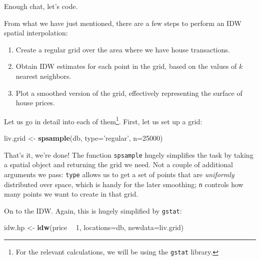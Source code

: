 \documentclass[
]{book}
\newenvironment{Shaded}{\begin{snugshade}}{\end{snugshade}}
\newcommand{\DataTypeTok}[1]{\textcolor[rgb]{0.13,0.29,0.53}{#1}}
\newcommand{\DecValTok}[1]{\textcolor[rgb]{0.00,0.00,0.81}{#1}}
\newcommand{\KeywordTok}[1]{\textcolor[rgb]{0.13,0.29,0.53}{\textbf{#1}}}
\newcommand{\NormalTok}[1]{#1}
\newcommand{\OperatorTok}[1]{\textcolor[rgb]{0.81,0.36,0.00}{\textbf{#1}}}
\newcommand{\StringTok}[1]{\textcolor[rgb]{0.31,0.60,0.02}{#1}}
\providecommand{\tightlist}{%
  \setlength{\itemsep}{0pt}\setlength{\parskip}{0pt}}
\begin{document}
Enough chat, let's code.

From what we have just mentioned, there are a few steps to perform an IDW spatial interpolation:

\begin{enumerate}
\def\labelenumi{\arabic{enumi}.}
\tightlist
\item
  Create a regular grid over the area where we have house transactions.
\item
  Obtain IDW estimates for each point in the grid, based on the values of \(k\) nearest neighbors.
\item
  Plot a smoothed version of the grid, effectively representing the surface of house prices.
\end{enumerate}

Let us go in detail into each of them\footnote{For the relevant calculations, we will be using the \texttt{gstat} library.}. First, let us set up a grid:

\begin{Shaded}
\begin{Highlighting}[]
\NormalTok{liv.grid <-}\StringTok{ }\KeywordTok{spsample}\NormalTok{(db, }\DataTypeTok{type=}\StringTok{'regular'}\NormalTok{, }\DataTypeTok{n=}\DecValTok{25000}\NormalTok{)}
\end{Highlighting}
\end{Shaded}

That's it, we're done! The function \texttt{spsample} hugely simplifies the task by taking a spatial object and returning the grid we need. Not a couple of additional arguments we pass: \texttt{type} allows us to get a set of points that are \emph{uniformly} distributed over space, which is handy for the later smoothing; \texttt{n} controls how many points we want to create in that grid.

On to the IDW. Again, this is hugely simplified by \texttt{gstat}:

\begin{Shaded}
\begin{Highlighting}[]
\NormalTok{idw.hp <-}\StringTok{ }\KeywordTok{idw}\NormalTok{(price }\OperatorTok{~}\StringTok{ }\DecValTok{1}\NormalTok{, }\DataTypeTok{locations=}\NormalTok{db, }\DataTypeTok{newdata=}\NormalTok{liv.grid)}
\end{Highlighting}
\end{Shaded}
\end{document}
